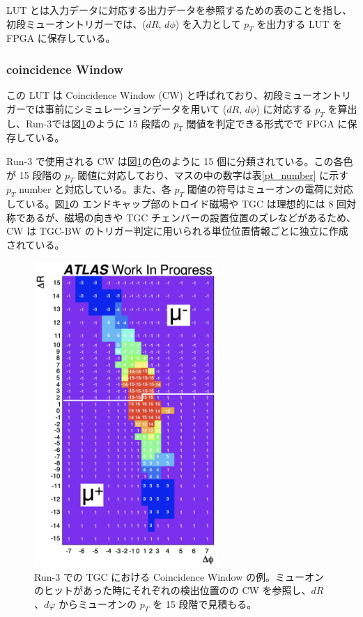 LUT とは入力データに対応する出力データを参照するための表のことを指し、初段ミューオントリガーでは、($dR$, $d\phi$) を入力として $p_T$ を出力する LUT を FPGA に保存している。

\subsubsection{coincidence Window}
この LUT は Coincidence Window (CW) と呼ばれており、初段ミューオントリガーでは事前にシミュレーションデータを用いて ($dR$, $d\phi$) に対応する $p_T$ を算出し、Run-3では図\ref{fig:CW}のように 15 段階の $p_T$ 閾値を判定できる形式でで FPGA に保存している。

Run-3 で使用される CW は図\ref{fig:CW}の色のように 15 個に分類されている。この各色が 15 段階の $p_T$ 閾値に対応しており、マスの中の数字は表\ref{pt_number} に示す $p_T$ number と対応している。また、各 $p_T$ 閾値の符号はミューオンの電荷に対応している。図\ref{fig:CW}の
エンドキャップ部のトロイド磁場や TGC は理想的には 8 回対称であるが、磁場の向きや TGC チェンバーの設置位置のズレなどがあるため、CW は TGC-BW のトリガー判定に用いられる単位位置情報ごとに独立に作成されている。


\begin{figure}[tb]
  \centering
  \includegraphics[clip, width=7cm]{fig/3/cw_run3_shiomi.png}
  \caption{Run-3 での TGC における Coincidence Window の例。ミューオンのヒットがあった時にそれぞれの検出位置のの CW を参照し、$dR$、$dφ$ からミューオンの $p_T$ を 15 段階で見積もる。}
  \label{fig:CW}
\end{figure}

